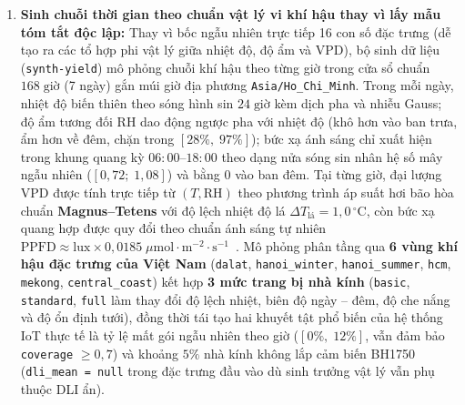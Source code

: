 \begin{enumerate}[leftmargin=*]
    \item \textbf{Sinh chuỗi thời gian theo chuẩn vật lý vi khí hậu thay vì lấy mẫu tóm tắt độc lập:} Thay vì bốc ngẫu nhiên trực tiếp 16 con số đặc trưng (dễ tạo ra các tổ hợp phi vật lý giữa nhiệt độ, độ ẩm và VPD), bộ sinh dữ liệu (\texttt{synth-yield}) mô phỏng chuỗi khí hậu theo từng giờ trong cửa sổ chuẩn \(168\;\text{giờ}\) (7 ngày) gắn múi giờ địa phương \texttt{Asia/Ho\_Chi\_Minh}. Trong mỗi ngày, nhiệt độ biến thiên theo sóng hình sin \(24\;\text{giờ}\) kèm dịch pha và nhiễu Gauss; độ ẩm tương đối \(\text{RH}\) dao động ngược pha với nhiệt độ (khô hơn vào ban trưa, ẩm hơn về đêm, chặn trong \([28\%,\; 97\%]\)); bức xạ ánh sáng chỉ xuất hiện trong khung quang kỳ \(06{:}00\text{--}18{:}00\) theo dạng nửa sóng sin nhân hệ số mây ngẫu nhiên (\([0{,}72;\; 1{,}08]\)) và bằng \(0\) vào ban đêm. Tại từng giờ, đại lượng VPD được tính trực tiếp từ \((T, \text{RH})\) theo phương trình áp suất hơi bão hòa chuẩn \textbf{Magnus--Tetens} với độ lệch nhiệt độ lá \(\Delta T_{\text{lá}} = 1{,}0\,^\circ\text{C}\), còn bức xạ quang hợp được quy đổi theo chuẩn ánh sáng tự nhiên \(\text{PPFD} \approx \text{lux} \times 0{,}0185\;\mu\text{mol}\cdot\text{m}^{-2}\cdot\text{s}^{-1}\)~\cite{monteithVpd}. Mô phỏng phân tầng qua \textbf{6 vùng khí hậu đặc trưng của Việt Nam} (\texttt{dalat}, \texttt{hanoi\_winter}, \texttt{hanoi\_summer}, \texttt{hcm}, \texttt{mekong}, \texttt{central\_coast}) kết hợp \textbf{3 mức trang bị nhà kính} (\texttt{basic}, \texttt{standard}, \texttt{full} làm thay đổi độ lệch nhiệt, biên độ ngày -- đêm, độ che nắng và độ ổn định tưới), đồng thời tái tạo hai khuyết tật phổ biến của hệ thống IoT thực tế là tỷ lệ mất gói ngẫu nhiên theo giờ (\([0\%,\; 12\%]\), vẫn đảm bảo \texttt{coverage} \(\ge 0{,}7\)) và khoảng \(5\%\) nhà kính không lắp cảm biến BH1750 (\texttt{dli\_mean = null} trong đặc trưng đầu vào dù sinh trưởng vật lý vẫn phụ thuộc DLI ẩn).


\end{enumerate}
